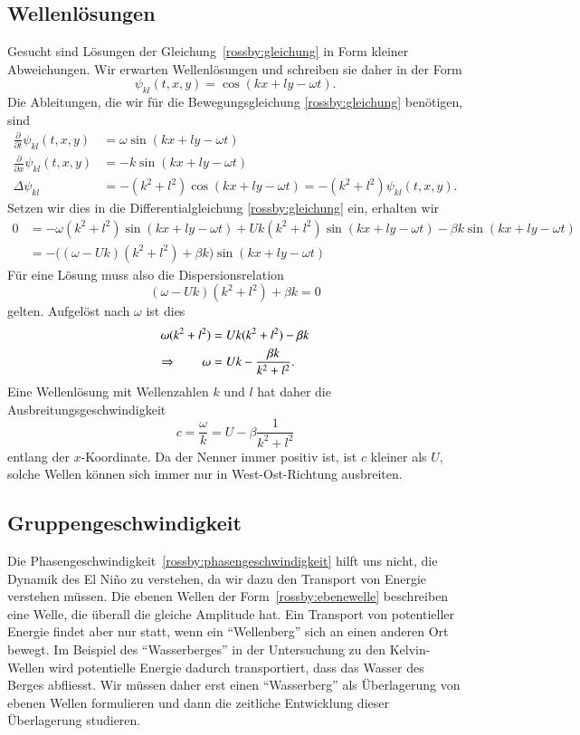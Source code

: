 \subsection{Wellenlösungen\label{subsection:rossby:loesungen}}
Gesucht sind Lösungen der Gleichung~\eqref{rossby:gleichung}
in Form kleiner Abweichungen.
Wir erwarten Wellenlösungen und schreiben sie daher in der Form
\begin{equation}
\psi_{kl}(t,x,y)
=
\cos(kx+ly-\omega t).
\label{rossby:ebenewelle}
\end{equation}
Die Ableitungen, die wir für die Bewegungsgleichung
\eqref{rossby:gleichung} benötigen, sind
\begin{align*}
\frac{\partial}{\partial t} \psi_{kl}(t,x,y)
&=
\omega \sin(kx+ly-\omega t)
\\
\frac{\partial}{\partial x} \psi_{kl}(t,x,y)
&=
-k
\sin(kx+ly-\omega t)
\\
\Delta\psi_{kl}
&=
-(k^2+l^2)\cos(kx+ly-\omega t)=-(k^2+l^2)\psi_{kl}(t,x,y).
\end{align*}
Setzen wir dies in die Differentialgleichung
\eqref{rossby:gleichung}
ein, erhalten wir 
\begin{align*}
0
&=
-
\omega(k^2+l^2) 
\sin(kx+ly-\omega t)
+
Uk(k^2+l^2)
\sin(kx+ly-\omega t)
-
\beta k
\sin(kx+ly-\omega t)
\\
&=
-\bigl((\omega-Uk)(k^2+l^2)+\beta k\bigr)
\sin(kx+ly-\omega t)
\end{align*}
Für eine Lösung muss also die Dispersionsrelation
\[
(\omega -Uk)(k^2+l^2) +\beta k=0
\]
gelten.
Aufgelöst nach $\omega$ ist dies
\begin{align}
\omega(k^2+l^2)
&=
Uk(k^2+l^2) -\beta k
\notag
\\
\Rightarrow\qquad
\omega
&=
Uk
-
\frac{\beta k}{k^2+l^2}.
\label{rossby:dispersion}
\end{align}
Eine Wellenlösung mit Wellenzahlen $k$ und $l$ hat daher 
die Ausbreitungsgeschwindigkeit 
\begin{equation}
c=\frac{\omega}{k} = U-\beta\frac{1}{k^2+l^2}
\label{rossby:phasengeschwindigkeit}
\end{equation}
entlang der $x$-Koordinate.
Da der Nenner immer positiv ist, ist $c$ kleiner als $U$, solche
Wellen können sich immer nur in West-Ost-Richtung ausbreiten.

\subsection{Gruppengeschwindigkeit}
Die Phasengeschwindigkeit~\eqref{rossby:phasengeschwindigkeit}
hilft uns nicht, die Dynamik des El Niño zu verstehen, da wir dazu
den Transport von Energie verstehen müssen.
Die ebenen Wellen der Form~\eqref{rossby:ebenewelle} beschreiben eine Welle,
die überall die gleiche Amplitude hat.
Ein Transport von potentieller Energie findet aber nur statt, wenn ein
``Wellenberg'' sich an einen anderen Ort bewegt.
Im Beispiel des ``Wasserberges'' in der Untersuchung zu den Kelvin-Wellen
wird potentielle Energie dadurch transportiert, dass das Wasser des Berges
abfliesst.
Wir müssen daher erst einen ``Wasserberg'' als Überlagerung von 
ebenen Wellen formulieren und dann die zeitliche Entwicklung dieser
Überlagerung studieren.

